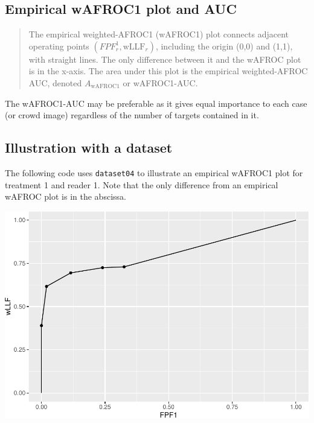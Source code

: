 \documentclass[
]{book}
\newenvironment{Shaded}{\begin{snugshade}}{\end{snugshade}}
\newcommand{\AttributeTok}[1]{\textcolor[rgb]{0.77,0.63,0.00}{#1}}
\newcommand{\DecValTok}[1]{\textcolor[rgb]{0.00,0.00,0.81}{#1}}
\newcommand{\FunctionTok}[1]{\textcolor[rgb]{0.00,0.00,0.00}{#1}}
\newcommand{\NormalTok}[1]{#1}
\newcommand{\OtherTok}[1]{\textcolor[rgb]{0.56,0.35,0.01}{#1}}
\newcommand{\SpecialCharTok}[1]{\textcolor[rgb]{0.00,0.00,0.00}{#1}}
\newcommand{\StringTok}[1]{\textcolor[rgb]{0.31,0.60,0.02}{#1}}
\begin{document}
\hypertarget{empirical-definition-empirical-auc-wafroc1}{%
\subsection{Empirical wAFROC1 plot and AUC}\label{empirical-definition-empirical-auc-wafroc1}}

\begin{quote}
The empirical weighted-AFROC1 (wAFROC1) plot connects adjacent operating points \(\left ( FPF_r^1, \text{wLLF}_r \right )\), including the origin (0,0) and (1,1), with straight lines. The only difference between it and the wAFROC plot is in the x-axis. The area under this plot is the empirical weighted-AFROC AUC, denoted \(A_{\text{wAFROC1}}\) or wAFROC1-AUC.
\end{quote}

The wAFROC1-AUC may be preferable as it gives equal importance to each case (or crowd image) regardless of the number of targets contained in it.

\hypertarget{empirical-wafroc1-plot-illustration}{%
\subsection{Illustration with a dataset}\label{empirical-wafroc1-plot-illustration}}

The following code uses \texttt{dataset04} to illustrate an empirical wAFROC1 plot for treatment 1 and reader 1. Note that the only difference from an empirical wAFROC plot is in the abscissa.

\begin{Shaded}
\end{Shaded}

\includegraphics{03-empirical_files/figure-latex/unnamed-chunk-34-1.pdf}
\end{document}
